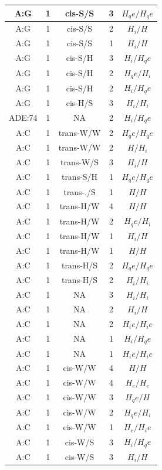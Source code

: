 \begin{center}
\begin{longtable}{c|c|c|c|c}
A:G & 1 & cis-S/S & 3 & $H_qe/H_qe$ \\  \hline
A:G & 1 & cis-S/S & 2 & $H_i/H$ \\  \hline
A:G & 1 & cis-S/S & 1 & $H_i/H$ \\  \hline
A:G & 1 & cis-S/H & 3 & $H_i/H_qe$ \\  \hline
A:G & 1 & cis-S/H & 2 & $H_qe/H_i$ \\  \hline
A:G & 1 & cis-S/H & 2 & $H_i/H_qe$ \\  \hline
A:G & 1 & cis-H/S & 3 & $H_i/H_i$ \\  \hline
ADE:74 & 1 & NA & 2 & $H_i/H_qe$ \\  \hline
A:C & 1 & trans-W/W & 2 & $H_qe/H_qe$ \\  \hline
A:C & 1 & trans-W/W & 2 & $H/H_i$ \\  \hline
A:C & 1 & trans-W/S & 3 & $H_i/H$ \\  \hline
A:C & 1 & trans-S/H & 1 & $H_qe/H_qe$ \\  \hline
A:C & 1 & trans-./S & 1 & $H/H$ \\  \hline
A:C & 1 & trans-H/W & 4 & $H/H$ \\  \hline
A:C & 1 & trans-H/W & 2 & $H_qe/H_i$ \\  \hline
A:C & 1 & trans-H/W & 1 & $H_i/H$ \\  \hline
A:C & 1 & trans-H/W & 1 & $H/H$ \\  \hline
A:C & 1 & trans-H/S & 2 & $H_qe/H_qe$ \\  \hline
A:C & 1 & trans-H/S & 2 & $H_i/H_i$ \\  \hline
A:C & 1 & NA & 3 & $H_i/H_i$ \\  \hline
A:C & 1 & NA & 2 & $H_i/H$ \\  \hline
A:C & 1 & NA & 2 & $H_ie/H_ie$ \\  \hline
A:C & 1 & NA & 1 & $H_i/H_qe$ \\  \hline
A:C & 1 & NA & 1 & $H_ie/H_ie$ \\  \hline
A:C & 1 & cis-W/W & 4 & $H/H$ \\  \hline
A:C & 1 & cis-W/W & 4 & $H_e/H_e$ \\  \hline
A:C & 1 & cis-W/W & 3 & $H_qe/H$ \\  \hline
A:C & 1 & cis-W/W & 2 & $H_qe/H_i$ \\  \hline
A:C & 1 & cis-W/W & 1 & $H_e/H_ie$ \\  \hline
A:C & 1 & cis-W/S & 3 & $H_i/H_qe$ \\  \hline
A:C & 1 & cis-W/S & 3 & $H_i/H$ \\  \hline

\end{longtable}
\end{center}

